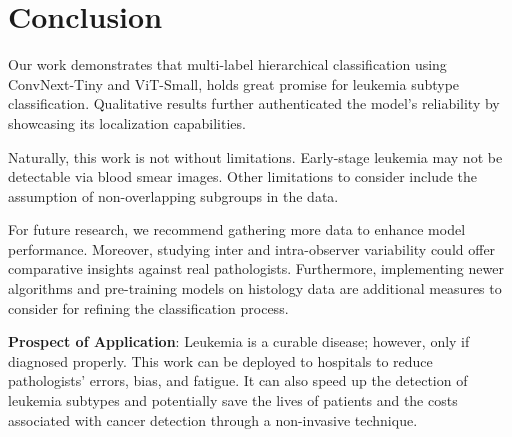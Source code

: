 \documentclass[runningheads]{llncs}
\begin{document}

\section{Conclusion}

Our work demonstrates that multi-label hierarchical classification using ConvNext-Tiny and ViT-Small, holds great promise for leukemia subtype classification. Qualitative results further authenticated the model's reliability by showcasing its localization capabilities.

Naturally, this work is not without limitations. Early-stage leukemia may not be detectable via blood smear images. Other limitations to consider include the assumption of non-overlapping subgroups in the data.

For future research, we recommend gathering more data to enhance model performance. Moreover, studying inter and intra-observer variability could offer comparative insights against real pathologists. Furthermore, implementing newer algorithms and pre-training models on histology data are additional measures to consider for refining the classification process.

\textbf{Prospect of Application}: Leukemia is a curable disease; however, only if diagnosed properly. This work can be deployed to hospitals to reduce pathologists' errors, bias, and fatigue. It can also speed up the detection of leukemia subtypes and potentially save the lives of patients and the costs associated with cancer detection through a non-invasive technique.


\end{document}
